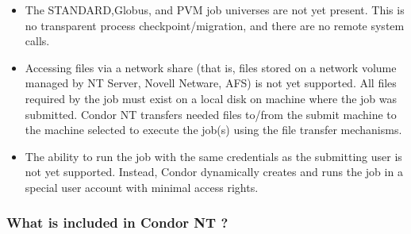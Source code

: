 \begin{itemize}

\item The STANDARD,Globus, and PVM job universes are not yet present.  
This is no
transparent process checkpoint/migration, and there are no
remote system calls.

\item Accessing files via a network share (that is,
files stored on a network volume managed by NT Server, Novell Netware, AFS)
is not yet supported.
All files required by the job must exist on a local disk on
machine where the job was submitted.
Condor NT transfers 
needed files to/from the submit machine to the machine selected to
execute the job(s) using the file transfer mechanisms.

\item The ability to run the job with the same credentials as the submitting
user is not yet supported.  Instead, Condor dynamically creates and runs the
job in a special user account with minimal access rights.

\end{itemize}

\subsubsection{What is included in Condor NT \VersionNotice?}


